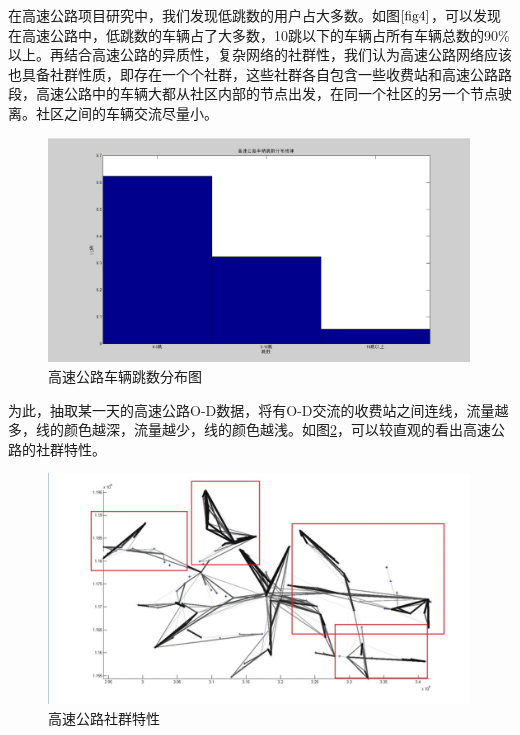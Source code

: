 				在高速公路项目研究中，我们发现低跳数的用户占大多数。如图$\ref{fig4}$，可以发现在高速公路中，低跳数的车辆占了大多数，10跳以下的车辆占所有车辆总数的90\%以上。再结合高速公路的异质性，复杂网络的社群性，我们认为高速公路网络应该也具备社群性质，即存在一个个社群，这些社群各自包含一些收费站和高速公路路段，高速公路中的车辆大都从社区内部的节点出发，在同一个社区的另一个节点驶离。社区之间的车辆交流尽量小。

				\begin{figure}[h]
				\centering
						\begin{minipage}{0.8\linewidth}
							\centering
							\includegraphics[width=4.4in]{picture/tiaoshu}
							\caption{高速公路车辆跳数分布图}
							\label{fig4}
						\end{minipage}%
				\end{figure}

				为此，抽取某一天的高速公路O-D数据，将有O-D交流的收费站之间连线，流量越多，线的颜色越深，流量越少，线的颜色越浅。如图\ref{fig5}，可以较直观的看出高速公路的社群特性。

				\begin{figure}[h]
				\centering
						\begin{minipage}{0.8\linewidth}
							\centering
							\includegraphics[width=4.4in]{picture/shequntexing}
							\caption{高速公路社群特性}
							\label{fig5}
						\end{minipage}%
				\end{figure}

